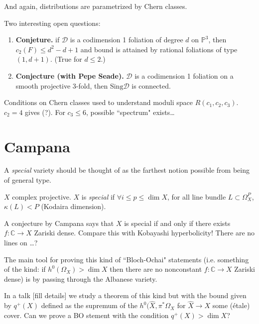 And again, distributions are parametrized by
Chern classes.

Two interesting open questions:
\begin{enumerate}
\item {\bf Conjeture.} if $\mathcal{D}$ is a
codimension 1 foliation of degree
$d$ on $\mathbb{P}^3$, then $c_2(F)\leq
d^2-d+1$ and
bound is attained
by rational foliations of type $(1,d+1)$.
(True for $d \leq 2$.)
\item {\bf Conjecture (with Pepe Seade).}
$\mathcal{D}$ is a codimension 1
foliation on a smooth projective 3-fold,
then $\text{Sing}\mathcal{D}$ is connected.
\end{enumerate}

\begin{theorem}
\label{theorem-jardim-muniz}
Conditions on Chern classes used to
understand moduli space $R(c_1,c_2,c_3)$.
$c_2=4$ gives (?). For $c_3\leq 6$, possible
``spectrum" exists…
\end{theorem}









\section{Campana}
\label{section-campana}

A \textit{special} variety should be thought
of
as the farthest notion possible from being of
general type.

\begin{definition}[Campana]
\label{definition-special-variety}
$X$ complex projective.
$X$ is \textit{special} if $\forall i \leq  p
\leq \dim X$,
for all line bundle $L \subset \Omega^P_X$,
$\kappa(L)<P$ (Kodaira dimension).
\end{definition}

\noindent
A conjecture by Campana says that
$X$ is special if and only if there exists
$f:\mathbb{C}\to X$
Zariski dense.
Compare this with Kobayashi hyperbolicity!
There are no lines on …?

The main tool for proving this kind of
``Bloch-Ochai" statements (i.e.
something of the kind: if $h^0(\Omega_X)>
\dim X$
then there are no nonconstant
$f:\mathbb{C}\to X$
Zariski dense)
is by passing through the Albanese variety.

In a talk [fill details]
we study a theorem of this kind but with the
bound
given by $q^+(X)$ defined as the supremum of
the $h^0(\hat{X},\pi^*\Omega_{X}$
for $\hat{X}\to X$ some (étale) cover.
Can we prove a BO stement with the condition
$q^+(X)>\dim X$?

